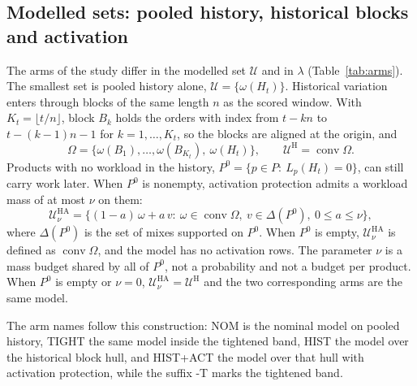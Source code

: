 \subsection{Modelled sets: pooled history, historical blocks and activation}\label{subsec:uncertainty}
The arms of the study differ in the modelled set $\mathcal U$ and in $\lambda$ (Table~\ref{tab:arms}). The smallest set is pooled history alone, $\mathcal U=\{\omega(H_t)\}$. Historical variation enters through blocks of the same length $n$ as the scored window. With $K_t=\lfloor t/n\rfloor$, block $B_k$ holds the orders with index from $t-kn$ to $t-(k-1)n-1$ for $k=1,\dots,K_t$, so the blocks are aligned at the origin, and
\begin{equation}
\Omega=\bigl\{\omega(B_1),\dots,\omega(B_{K_t}),\ \omega(H_t)\bigr\},\qquad \mathcal U^{\mathrm{H}}=\operatorname{conv}\Omega. \label{eq:hull}
\end{equation}
Products with no workload in the history, $P^0=\{p\in P:\ L_p(H_t)=0\}$, can still carry work later. When $P^0$ is nonempty, activation protection admits a workload mass of at most $\nu$ on them:
\begin{equation}
\mathcal U^{\mathrm{HA}}_\nu=\bigl\{(1-a)\,\omega+a\,v:\ \omega\in\operatorname{conv}\Omega,\ v\in\Delta(P^0),\ 0\le a\le\nu\bigr\}, \label{eq:activation}
\end{equation}
where $\Delta(P^0)$ is the set of mixes supported on $P^0$. When $P^0$ is empty, $\mathcal U^{\mathrm{HA}}_\nu$ is defined as $\operatorname{conv}\Omega$, and the model has no activation rows. The parameter $\nu$ is a mass budget shared by all of $P^0$, not a probability and not a budget per product. When $P^0$ is empty or $\nu=0$, $\mathcal U^{\mathrm{HA}}_\nu=\mathcal U^{\mathrm{H}}$ and the two corresponding arms are the same model.

The arm names follow this construction: NOM is the nominal model on pooled history, TIGHT the same model inside the tightened band, HIST the model over the historical block hull, and HIST+ACT the model over that hull with activation protection, while the suffix -T marks the tightened band.

